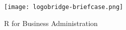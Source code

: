 %
%
%
%
%

\date {}
\thispagestyle{empty}
\begin{center}
\par
\texttt{[image: logobridge-briefcase.png]}
\par
\null\vfill
{\fontsize{25pt}{5cm}\selectfont \textcolor{ao-purple}{R for Business Administration}}
\end{center}
